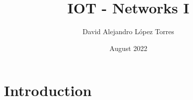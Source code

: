 \documentclass[11pt,letterpaper,spanish]{article}
\title{IOT - Networks I}
\author{David Alejandro L\'opez Torres}
\date{August 2022}
\theoremstyle{definition}
\begin{document}
\maketitle

\section{Introduction}
\end{document}
